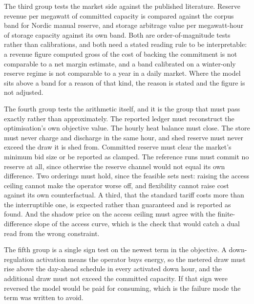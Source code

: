 The third group tests the market side against the published literature. Reserve revenue per megawatt of committed capacity is compared against the corpus band for Nordic manual reserve, and storage arbitrage value per megawatt-hour of storage capacity against its own band. Both are order-of-magnitude tests rather than calibrations, and both need a stated reading rule to be interpretable: a revenue figure computed gross of the cost of backing the commitment is not comparable to a net margin estimate, and a band calibrated on a winter-only reserve regime is not comparable to a year in a daily market. Where the model sits above a band for a reason of that kind, the reason is stated and the figure is not adjusted.

The fourth group tests the arithmetic itself, and it is the group that must pass exactly rather than approximately. The reported ledger must reconstruct the optimisation's own objective value. The hourly heat balance must close. The store must never charge and discharge in the same hour, and shed reserve must never exceed the draw it is shed from. Committed reserve must clear the market's minimum bid size or be reported as clamped. The reference runs must commit no reserve at all, since otherwise the reserve channel would not equal its own difference. Two orderings must hold, since the feasible sets nest: raising the access ceiling cannot make the operator worse off, and flexibility cannot raise cost against its own counterfactual. A third, that the standard tariff costs more than the interruptible one, is expected rather than guaranteed and is reported as found. And the shadow price on the access ceiling must agree with the finite-difference slope of the access curve, which is the check that would catch a dual read from the wrong constraint.

The fifth group is a single sign test on the newest term in the objective. A down-regulation activation means the operator buys energy, so the metered draw must rise above the day-ahead schedule in every activated down hour, and the additional draw must not exceed the committed capacity. If that sign were reversed the model would be paid for consuming, which is the failure mode the term was written to avoid.

